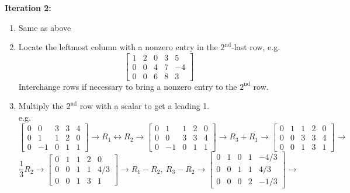 \documentclass[]{article}
\begin{document}
		{\bf Iteration 2:}
		\begin{enumerate}
			\item Same as above
			\item Locate the leftmost column with a nonzero entry in the $2^{\text{nd}}$-last row, e.g.
			$$
				\left[
					\begin{array}{cccc|c}
						{1}&{2}&{0}&{3}&{5}\\
						{0}&{0}&{4}&{7}&{-4}\\
						{0}&{0}&{6}&{8}&{3}
					\end{array}
				\right]
			$$
			Interchange rows if necessary to bring a nonzero entry to the $2^{\text{nd}}$ row.
			\item Multiply the $2^{\text{nd}}$ row with a scalar to get a leading 1.\\
			e.g.
			$$
				\left[
					\begin{array}{cccc|c}
						{0}&{0}&{3}&{3}&{4}\\
						{0}&{1}&{1}&{2}&{0}\\
						{0}&{-1}&{0}&{1}&{1}
					\end{array}
				\right]\rightarrow R_1\leftrightarrow R_2\rightarrow
				\left[
					\begin{array}{cccc|c}
						{0}&{1}&{1}&{2}&{0}\\
						{0}&{0}&{3}&{3}&{4}\\
						{0}&{-1}&{0}&{1}&{1}
					\end{array}
				\right]\rightarrow R_3+R_1\rightarrow
				\left[
					\begin{array}{cccc|c}
						{0}&{1}&{1}&{2}&{0}\\
						{0}&{0}&{3}&{3}&{4}\\
						{0}&{0}&{1}&{3}&{1}
					\end{array}
				\right]\rightarrow
			$$
			$$
				\frac{1}{3}R_2\rightarrow
				\left[
					\begin{array}{cccc|c}
						{0}&{1}&{1}&{2}&{0}\\
						{0}&{0}&{1}&{1}&{4/3}\\
						{0}&{0}&{1}&{3}&{1}
					\end{array}
				\right]\rightarrow R_1-R_2,~R_3-R_2\rightarrow
				\left[
					\begin{array}{cccc|c}
						{0}&{1}&{0}&{1}&{-4/3}\\
						{0}&{0}&{1}&{1}&{4/3}\\
						{0}&{0}&{0}&{2}&{-1/3}
					\end{array}
				\right]\rightarrow
			$$

\end{enumerate}
\end{document}

